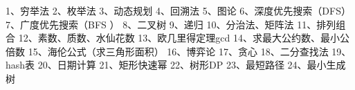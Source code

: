 1、穷举法   2、枚举法   3、动态规划   4、回溯法   5、图论   6、深度优先搜索（DFS）   7、广度优先搜索（BFS ）
8、二叉树   9、递归  10、分治法、矩阵法   11、排列组合   12、素数、质数、水仙花数  13、欧几里得定理gcd  
14、求最大公约数、最小公倍数  15、海伦公式（求三角形面积）  16、博弈论  17、贪心 18、二分查找法 
19、hash表  20、日期计算  21、矩形快速幂  22、树形DP  23、最短路径  24、最小生成树